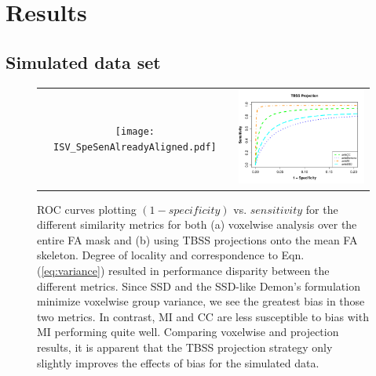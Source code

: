 \documentclass[final,5p,times,twocolumn]{elsarticle}
\begin{document}
\section{Results}

\subsection{Simulated data set} 


\begin{figure}
\begin{center}
\begin{tabular}{cc}
  \texttt{[image: ISV\_SpeSenAlreadyAligned.pdf]} &
  \includegraphics[width=86mm]{ISV_SpeSen_projectionAlreadyAligned.pdf}
\end{tabular}
\caption{ROC curves plotting $(1 - specificity)$ vs. $sensitivity$ for the
different similarity metrics for both (a) voxelwise analysis over the
entire FA mask and (b) using TBSS projections onto the mean FA skeleton.
Degree of locality and correspondence to 
Eqn. (\ref{eq:variance}) resulted in performance disparity between the
different metrics.  Since SSD and the SSD-like Demon's formulation 
minimize voxelwise group variance, we see the greatest bias in those 
two metrics.  In contrast, MI and CC are less susceptible to bias with
MI performing quite well.  Comparing voxelwise and projection results, 
it is apparent that the TBSS projection strategy only slightly improves 
the effects of bias for the simulated data.
}
\label{fig:simulated_plots}
\end{center}        
\end{figure}
\end{document}
